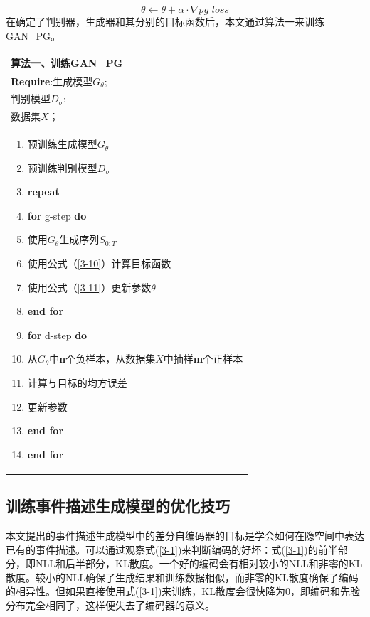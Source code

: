 \begin{equation}\label{3-11}
    \theta \leftarrow \theta + \alpha \cdot \nabla pg\_loss
\end{equation}
在确定了判别器，生成器和其分别的目标函数后，本文通过算法一来训练GAN\_PG。
\begin{table}[htb]
    
    \centering
        \begin{tabular*}{\linewidth}{p{\linewidth}}
\toprule
            算法一、训练GAN\_PG \\
\midrule
\textbf{Require}:生成模型$G_\theta$;\\
判别模型$D_\sigma$;\\
数据集$X$；\\ 
\begin{minipage}[t]{\linewidth}
\begin{enumerate}[itemsep=-6pt]
    \small
    \item 预训练生成模型$G_\theta$
    \item 预训练判别模型$D_\sigma$
    \item \textbf{repeat}
    \item \quad \textbf{for} g-step \textbf{do}
    \item \quad \quad 使用$G_\theta$生成序列$S_{0:T}$
    \item \quad \quad 使用公式（\ref{3-10}）计算目标函数
    \item \quad \quad 使用公式（\ref{3-11}）更新参数$\theta$
    \item \quad \textbf{end for}
    \item \quad \textbf{for} d-step \textbf{do}
    \item \quad \quad 从$G_\theta$中\textbf{n}个负样本，从数据集$X$中抽样\textbf{m}个正样本
    \item \quad \quad 计算与目标的均方误差
    \item \quad \quad 更新参数
    \item \quad \textbf{end for}  
    \item \textbf{end for}
\end{enumerate}
\end{minipage}\\
\bottomrule
        \end{tabular*}
    \label{s3-1}
\end{table}

\subsection{训练事件描述生成模型的优化技巧}\label{train_generator}
本文提出的事件描述生成模型中的差分自编码器的目标是学会如何在隐空间中表达已有的事件描述。可以通过观察式(\ref{3-1})来判断编码的好坏：式(\ref{3-1})的前半部分，即NLL和后半部分，KL散度。一个好的编码会有相对较小的NLL和非零的KL散度。较小的NLL确保了生成结果和训练数据相似，而非零的KL散度确保了编码的相异性。但如果直接使用式(\ref{3-1})来训练，KL散度会很快降为0，即编码和先验分布完全相同了，这样便失去了编码器的意义。

